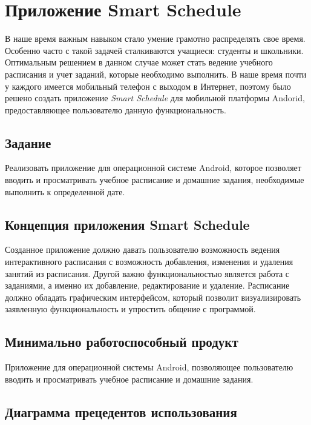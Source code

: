 



\tableofcontents
\newpage

\section{Приложение Smart Schedule}

В наше время важным навыком стало умение грамотно распределять свое время. Особенно часто с такой задачей сталкиваются учащиеся: студенты и школьники. Оптимальным решением в данном случае может стать ведение учебного расписания и учет заданий, которые необходимо выполнить. В наше время почти у каждого имеется мобильный телефон с выходом в Интернет, поэтому было решено создать приложение \textit{Smart Schedule} для мобильной платформы Andorid, предоставляющее пользователю данную функциональность.

\subsection{Задание}

Реализовать приложение для операционной системе Android, которое позволяет вводить и просматривать учебное расписание и домашние задания, необходимые выполнить к определенной дате.

\subsection{Концепция приложения Smart Schedule}

Созданное приложение должно давать пользователю возможность ведения интерактивного расписания с возможность добавления, изменения и удаления занятий из расписания. Другой важно функциональностью является работа с заданиями, а именно их добавление, редактирование и удаление. Расписание должно обладать графическим интерфейсом, который позволит визуализировать заявленную функциональность и упростить общение с программой.

\subsection{Минимально работоспособный продукт}

Приложение для операционной системы Android, позволяющее пользователю вводить и просматривать учебное расписание и домашние задания.

\subsection{Диаграмма прецедентов использования}

